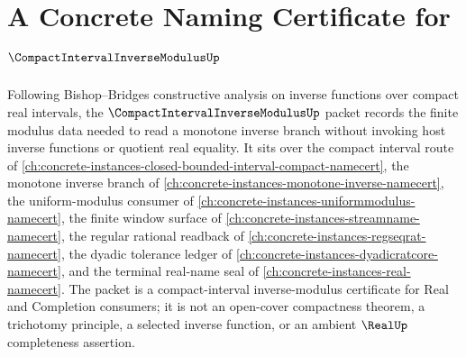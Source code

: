\chapter{A Concrete Naming Certificate for $\CompactIntervalInverseModulusUp$}
\label{ch:concrete-instances-compact-interval-inverse-modulus-namecert}

Following Bishop--Bridges constructive analysis on inverse functions over compact real intervals, the $\CompactIntervalInverseModulusUp$ packet records the finite modulus data needed to read a monotone inverse branch without invoking host inverse functions or quotient real equality. It sits over the compact interval route of \autoref{ch:concrete-instances-closed-bounded-interval-compact-namecert}, the monotone inverse branch of \autoref{ch:concrete-instances-monotone-inverse-namecert}, the uniform-modulus consumer of \autoref{ch:concrete-instances-uniformmodulus-namecert}, the finite window surface of \autoref{ch:concrete-instances-streamname-namecert}, the regular rational readback of \autoref{ch:concrete-instances-regseqrat-namecert}, the dyadic tolerance ledger of \autoref{ch:concrete-instances-dyadicratcore-namecert}, and the terminal real-name seal of \autoref{ch:concrete-instances-real-namecert}. The packet is a compact-interval inverse-modulus certificate for Real and Completion consumers; it is not an open-cover compactness theorem, a trichotomy principle, a selected inverse function, or an ambient $\RealUp$ completeness assertion.

